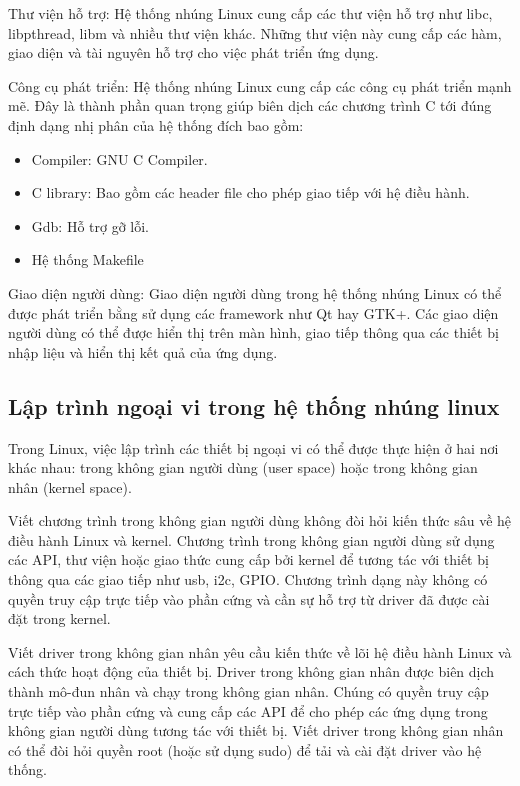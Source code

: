 \documentclass{report}
\begin{document}
Thư viện hỗ trợ: Hệ thống nhúng Linux cung cấp các thư viện hỗ trợ như libc, libpthread, libm và nhiều thư viện khác. Những thư viện này cung cấp các hàm, giao diện và tài nguyên hỗ trợ cho việc phát triển ứng dụng.

Công cụ phát triển: Hệ thống nhúng Linux cung cấp các công cụ phát triển mạnh mẽ. Đây là thành phần quan trọng giúp biên dịch các chương trình C tới đúng định dạng nhị phân của hệ thống đích bao gồm:
\begin{itemize}
	\item Compiler: GNU C Compiler.
	\item C library: Bao gồm các header file cho phép giao tiếp với hệ điều hành.
	\item Gdb: Hỗ trợ gỡ lỗi.
	\item Hệ thống Makefile
\end{itemize}

Giao diện người dùng: Giao diện người dùng trong hệ thống nhúng Linux có thể được phát triển bằng sử dụng các framework như Qt hay GTK+. Các giao diện người dùng có thể được hiển thị trên màn hình, giao tiếp thông qua các thiết bị nhập liệu và hiển thị kết quả của ứng dụng.


\subsection{Lập trình ngoại vi trong hệ thống nhúng linux}
Trong Linux, việc lập trình các thiết bị ngoại vi có thể được thực hiện ở hai nơi khác nhau: trong không gian người dùng (user space) hoặc trong không gian nhân (kernel space). 

Viết chương trình trong không gian người dùng không đòi hỏi kiến thức sâu về hệ điều hành Linux và kernel. Chương trình trong không gian người dùng sử dụng các API, thư viện hoặc giao thức cung cấp bởi kernel để tương tác với thiết bị thông qua các giao tiếp như \acrshort{usb}, \acrshort{i2c}, GPIO. Chương trình dạng này không có quyền truy cập trực tiếp vào phần cứng và cần sự hỗ trợ từ driver đã được cài đặt trong kernel.

Viết driver trong không gian nhân yêu cầu kiến thức về lõi hệ điều hành Linux và cách thức hoạt động của thiết bị.
Driver trong không gian nhân được biên dịch thành mô-đun nhân và chạy trong không gian nhân. Chúng có quyền truy cập trực tiếp vào phần cứng và cung cấp các API để cho phép các ứng dụng trong không gian người dùng tương tác với thiết bị.
Viết driver trong không gian nhân có thể đòi hỏi quyền root (hoặc sử dụng sudo) để tải và cài đặt driver vào hệ thống.
\end{document}
